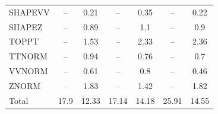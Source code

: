 \begin{table}[H]
\begin{center}
\begin{footnotesize}
\begin{tabular}{lcccccc}
				SHAPEVV & -- &  0.21 & -- &  0.35 & -- &  0.22 \\
				SHAPEZ & -- &  0.89 & -- &  1.1 & -- &  0.9 \\
				TOPPT & -- &  1.53 & -- &  2.33 & -- &  2.36 \\
				TTNORM & -- &  0.94 & -- &  0.76 & -- &  0.7 \\
				VVNORM & -- &  0.61 & -- &  0.8 & -- &  0.46 \\
				ZNORM & -- &  1.83 & -- &  1.42 & -- &  1.82 \\
				Total &  17.9  &  12.33 &  17.14  &  14.18 &  25.91  &  14.55 \\ \hline \hline
			\end{tabular}
			\label{tab:SysUncertainties_1400}
        \end{footnotesize}
	\end{center}
\end{table}


